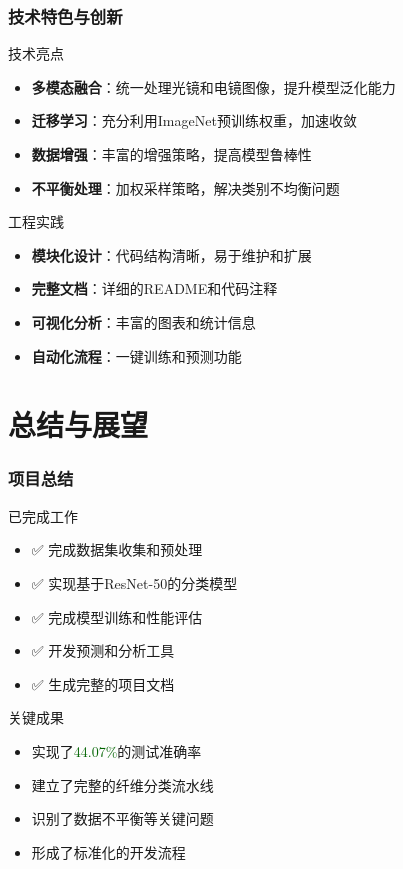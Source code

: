 \documentclass[12pt]{beamer}
\begin{document}
\begin{frame}
\frametitle{技术特色与创新}
\begin{block}{技术亮点}
\begin{itemize}
    \item \textbf{多模态融合}：统一处理光镜和电镜图像，提升模型泛化能力
    \item \textbf{迁移学习}：充分利用ImageNet预训练权重，加速收敛
    \item \textbf{数据增强}：丰富的增强策略，提高模型鲁棒性
    \item \textbf{不平衡处理}：加权采样策略，解决类别不均衡问题
\end{itemize}
\end{block}

\begin{block}{工程实践}
\begin{itemize}
    \item \textbf{模块化设计}：代码结构清晰，易于维护和扩展
    \item \textbf{完整文档}：详细的README和代码注释
    \item \textbf{可视化分析}：丰富的图表和统计信息
    \item \textbf{自动化流程}：一键训练和预测功能
\end{itemize}
\end{block}
\end{frame}

\section{总结与展望}

\begin{frame}
\frametitle{项目总结}
\begin{block}{已完成工作}
\begin{itemize}
    \item ✅ 完成数据集收集和预处理
    \item ✅ 实现基于ResNet-50的分类模型
    \item ✅ 完成模型训练和性能评估
    \item ✅ 开发预测和分析工具
    \item ✅ 生成完整的项目文档
\end{itemize}
\end{block}

\begin{block}{关键成果}
\begin{itemize}
    \item 实现了\textcolor{darkgreen}{44.07\%}的测试准确率
    \item 建立了完整的纤维分类流水线
    \item 识别了数据不平衡等关键问题
    \item 形成了标准化的开发流程
\end{itemize}
\end{block}
\end{frame}
\end{document}

